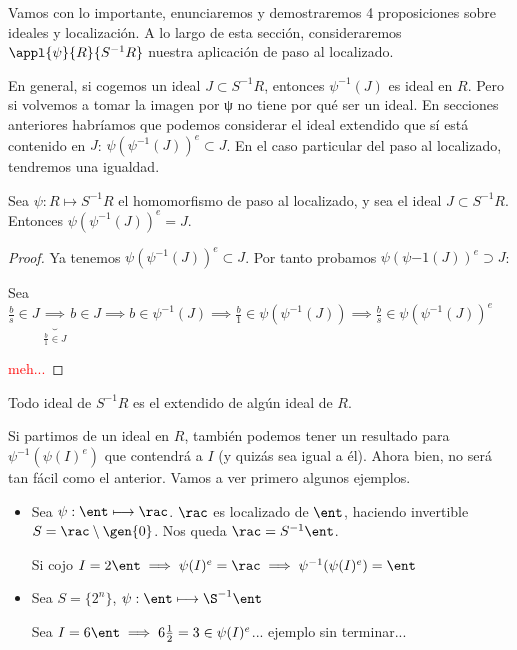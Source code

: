 Vamos con lo importante, enunciaremos y demostraremos 4 proposiciones sobre ideales y localización. A lo largo de esta sección, consideraremos $\appl{\psi}{R}{S^{-1}R}$ nuestra aplicación de paso al localizado.

En general, si cogemos un ideal $J \subset S^{-1}R$, entonces $\psi^{-1}(J)$ es ideal en $R$. Pero si volvemos a tomar la imagen por ψ no tiene por qué ser un ideal. En secciones anteriores habríamos que podemos considerar el ideal extendido que sí está contenido en $J$: $\psi(\psi^{-1}(J))^e \subset J$. En el caso particular del paso al localizado, tendremos una igualdad.

\begin{prop}
	Sea $\psi:R \longmapsto S^{-1}R$ el homomorfismo de paso al localizado, y sea el ideal $J \subset S^{-1}R$.  Entonces $\psi(\psi^{-1}(J))^e = J$.
\end{prop}

\begin{proof}
	Ya tenemos $\psi(\psi^{-1}(J))^e \subset J$. Por tanto probamos $\psi(\psi{-1}(J))^e \supset J$:

	Sea $\frac{b}{s} \in J \underbrace{\implies}_{\frac{b}{1}\in J} b \in J \implies b \in \psi^{-1}(J) \implies \frac{b}{1} \in \psi(\psi^{-1}(J)) \implies \frac{b}{s} \in \psi(\psi^{-1}(J))^e$

	\textcolor{red}{meh...}
\end{proof}


\obs Todo ideal de $S^{-1}R$ es el extendido de algún ideal de $R$.

Si partimos de un ideal en $R$, también podemos tener un resultado para $\psi^{-1}(\psi(I)^e) $ que contendrá a $I$ (y quizás sea igual a él). Ahora bien, no será tan fácil como el anterior. Vamos a ver primero algunos ejemplos.

\begin{example}
	\begin{itemize}
		\item Sea $\psi: \ent \longmapsto \rac$. $\rac$ es localizado de $\ent$, haciendo invertible $S=\rac \setminus\gen{0}$. Nos queda $\rac=S^{-1}\ent$.

		Si cojo $I=2\ent \implies \psi(I)^e=\rac \implies \psi^{-1}(\psi(I)^e)= \ent$

		\item Sea $S=\{ 2^n \}$, $\psi: \ent \longmapsto \S^{-1}\ent$

		Sea $I=6\ent\implies 6\frac{1}{2}=3 \in \psi(I)^e$... ejemplo sin terminar...
	\end{itemize}
\end{example}

